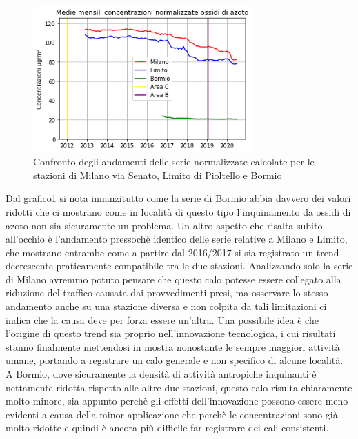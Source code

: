 \documentclass[a4paper]{report}
\begin{document}
\begin{figure}[h]
\centering
\includegraphics[width=0.75\textwidth]{nox_traffico}
\caption{Confronto degli andamenti delle serie normalizzate calcolate per le stazioni di Milano via Senato, Limito di Pioltello e Bormio}
\label{fig:nox_traffico}
\end{figure}

Dal grafico\ref{fig:nox_traffico} si nota innanzitutto come la serie di Bormio abbia davvero dei valori ridotti che ci mostrano come in località di questo tipo l'inquinamento da ossidi di azoto non sia sicuramente un problema.
Un altro aspetto che risalta subito all'occhio è l'andamento pressochè identico delle serie relative a Milano e Limito, che mostrano entrambe come a partire dal 2016/2017 si sia registrato un trend decrescente praticamente compatibile tra le due stazioni. Analizzando solo la serie di Milano avremmo potuto pensare che questo calo potesse essere collegato alla riduzione del traffico causata dai provvedimenti presi, ma osservare lo stesso andamento anche su una stazione diversa e non colpita da tali limitazioni ci indica che la causa deve per forza essere un'altra. Una possibile idea è che l'origine di questo trend sia proprio nell'innovazione tecnologica, i cui risultati stanno finalmente mettendosi in mostra nonostante le sempre maggiori attività umane, portando a registrare un calo generale e non specifico di alcune località. A Bormio, dove sicuramente la densità di attività antropiche inquinanti è nettamente ridotta rispetto alle altre due stazioni, questo calo risulta chiaramente molto minore, sia appunto perchè gli effetti dell'innovazione possono essere meno evidenti a causa della minor applicazione che perchè le concentrazioni sono già molto ridotte e quindi è ancora più difficile far registrare dei cali consistenti.

\end{document}
